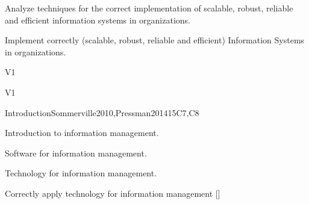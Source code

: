 \begin{syllabus}


\begin{justification}
Analyze techniques for the correct implementation of scalable, robust, reliable and efficient information systems in organizations.
\end{justification}

\begin{goals}
\item Implement correctly (scalable, robust, reliable and efficient) Information Systems in organizations.
\end{goals}

\begin{outcomes}{V1}
    \item {}
    \item {}
    \item {}
\end{outcomes}

\begin{competences}{V1}
    \item {} 
    \item {} 
    \item {} 
    \item {} 
    \item {} 
    \item {} 
\end{competences}

\begin{unit}{Introduction}{}{Sommerville2010,Pressman2014}{15}{C7,C8}
\begin{topics}
    \item Introduction to information management.
    \item Software for information management.
    \item Technology for information management.
\end{topics}
\begin{learningoutcomes}
    \item Correctly apply technology for information management [\Assessment]
\end{learningoutcomes}
\end{unit}


\end{syllabus}
